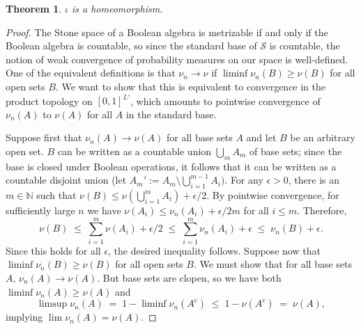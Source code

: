 \documentclass[12pt]{article}
\newcommand{\cS}{\mathcal{S}}
\theoremstyle{plain}
\newtheorem{theorem}{Theorem}[subsection]
\theoremstyle{definition}
\theoremstyle{remark}
\begin{document}
\begin{theorem}
$\iota$ is a homeomorphism.
\end{theorem}
\begin{proof}
The Stone space of a Boolean algebra is metrizable if and only if the Boolean algebra is countable, so since the standard base of $\cS$ is countable, the notion of weak convergence of probability measures on our space is well-defined. One of the equivalent definitions is that $\nu_n\to\nu$ if $\liminf\nu_n(B)\ge\nu(B)$ for all open sets $B$. We want to show that this is equivalent to convergence in the product topology on $[0,1]^{L'}$, which amounts to pointwise convergence of $\nu_n(A)$ to $\nu(A)$ for all $A$ in the standard base.

Suppose first that $\nu_n(A)\to\nu(A)$ for all base sets $A$ and let $B$ be an arbitrary open set. $B$ can be written as a countable union $\textstyle\bigcup_m A_m$ of base sets; since the base is closed under Boolean operations, it follows that it can be written as a countable disjoint union (let $\textstyle A_m' := A_m\setminus\bigcup_{i=1}^{m-1}A_i)$. For any $\epsilon>0$, there is an $m\in\mathbb{N}$ such that $\textstyle\nu(B)\le\nu(\bigcup_{i=1}^m A_i)+\epsilon/2$. By pointwise convergence, for sufficiently large $n$ we have $\nu(A_i)\le\nu_n(A_i) + \epsilon/2m$ for all $i\le m$. Therefore,
\[
\textstyle\nu(B)\;\le\;\sum_{i=1}^m\nu(A_i)+\epsilon/2\;\le\;\sum_{i=1}^m\nu_n(A_i) + \epsilon\;\le\;\nu_n(B)+\epsilon.
\]
Since this holds for all $\epsilon$, the desired inequality follows.
Suppose now that $\liminf\nu_n(B)\ge\nu(B)$ for all open sets $B$. We must show that for all base sets $A$, $\nu_n(A)\to\nu(A)$. But base sets are clopen, so we have both $\liminf\nu_n(A)\ge\nu(A)$ and
\[
\limsup\nu_n(A) \;=\; 1-\liminf\nu_n(A^c) \;\le\; 1 - \nu(A^c) \;=\; \nu(A),
\]
implying $\lim\nu_n(A) = \nu(A)$.
\end{proof}
\end{document}
